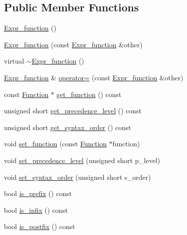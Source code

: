 \subsection*{Public Member Functions}
\begin{CompactItemize}
\item 
\hyperlink{classgenevalmag_1_1Expr__function_11842df1439746a952704518f5e1df1e}{Expr\_\-function} ()
\item 
\hyperlink{classgenevalmag_1_1Expr__function_2e4a1518e004d243a209e5c9ca0e54b4}{Expr\_\-function} (const \hyperlink{classgenevalmag_1_1Expr__function}{Expr\_\-function} \&other)
\item 
virtual \hyperlink{classgenevalmag_1_1Expr__function_e7de6c473686005994a3444e6d953e52}{$\sim$Expr\_\-function} ()
\item 
\hyperlink{classgenevalmag_1_1Expr__function}{Expr\_\-function} \& \hyperlink{classgenevalmag_1_1Expr__function_eac7341725e1953e65f251314fde4f54}{operator=} (const \hyperlink{classgenevalmag_1_1Expr__function}{Expr\_\-function} \&other)
\item 
const \hyperlink{classgenevalmag_1_1Function}{Function} $\ast$ \hyperlink{classgenevalmag_1_1Expr__function_7f1fedb3efc2c8eaf07877a8e72a2579}{get\_\-function} () const 
\item 
unsigned short \hyperlink{classgenevalmag_1_1Expr__function_25e611b881f5e74cd37d968c128a4f1b}{get\_\-precedence\_\-level} () const 
\item 
unsigned short \hyperlink{classgenevalmag_1_1Expr__function_f80357473c344ff776ec298d4424cbc0}{get\_\-syntax\_\-order} () const 
\item 
void \hyperlink{classgenevalmag_1_1Expr__function_9d3e5b95868a98b9014d0f1de4ac8ae8}{set\_\-function} (const \hyperlink{classgenevalmag_1_1Function}{Function} $\ast$function)
\item 
void \hyperlink{classgenevalmag_1_1Expr__function_9ad92c765b202584cc0d5b4648b2e44b}{set\_\-precedence\_\-level} (unsigned short p\_\-level)
\item 
void \hyperlink{classgenevalmag_1_1Expr__function_4d7c89c116c5f5f081f3527aa76b5e97}{set\_\-syntax\_\-order} (unsigned short s\_\-order)
\item 
bool \hyperlink{classgenevalmag_1_1Expr__function_0534ddcde21e3bd35fe12e85f6d8251f}{is\_\-prefix} () const 
\item 
bool \hyperlink{classgenevalmag_1_1Expr__function_f5a16ffe850f268df142c625205961dc}{is\_\-infix} () const 
\item 
bool \hyperlink{classgenevalmag_1_1Expr__function_8ef52d8fec97d084be0b24e5207a0551}{is\_\-postfix} () const 

\end{CompactItemize}
